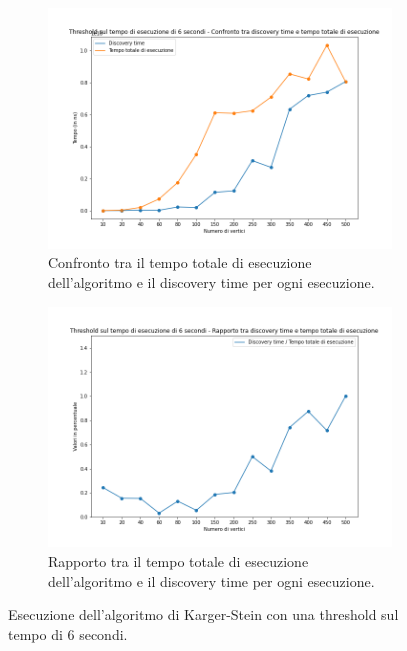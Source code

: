 \begin{figure}[H]
	\begin{subfigure}{.5\textwidth}
	  \centering
	  \includegraphics[width=1\textwidth]{res/images/single/karger-stein/discovery-time/threshold6/karger_stein_confronto_discovery_time_total_time_threshold_6s.png}
	  \caption{Confronto tra il tempo totale di esecuzione dell'algoritmo e il discovery time per ogni esecuzione.}
	  \label{fig:karger_stein_confronto_discovery_time_total_time_threshold_6s}
	\end{subfigure}
	\begin{subfigure}{.5\textwidth}
	  \centering
	  \includegraphics[width=1\textwidth]{res/images/single/karger-stein/discovery-time/threshold6/karger_stein_rapporto_discovery_time_total_time_threshold_6s.png}
	  \caption{Rapporto tra il tempo totale di esecuzione dell'algoritmo 
	  e il discovery time per ogni esecuzione.}
	  \label{fig:karger_stein_rapporto_discovery_time_total_time_threshold_6s}
	\end{subfigure}
	\caption{Esecuzione dell'algoritmo di Karger-Stein con una threshold sul tempo di 
	6 secondi.}
	\label{fig:karger_stein_discovery_time_threshold_6s}
\end{figure}

